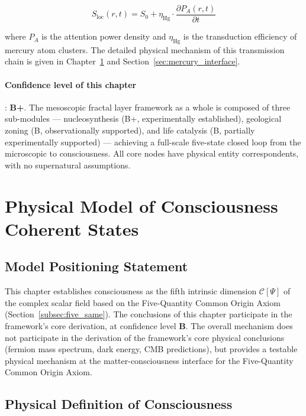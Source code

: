 \documentclass[12pt,a4paper,twocolumn]{article}
\begin{document}
\begin{equation}
\label{eq:Sloc_meso}
S_{\text{loc}}(r,t) = S_0 + \eta_{\text{Hg}} \cdot \frac{\partial P_A(r,t)}{\partial t}
\end{equation}

where $P_A$ is the attention power density and $\eta_{\text{Hg}}$ is the transduction efficiency of mercury atom clusters. The detailed physical mechanism of this transmission chain is given in Chapter~\ref{sec:consciousness} and Section~\ref{sec:mercury_interface}.

\paragraph{Confidence level of this chapter}: \textbf{B+}. The mesoscopic fractal layer framework as a whole is composed of three sub-modules --- nucleosynthesis (B+, experimentally established), geological zoning (B, observationally supported), and life catalysis (B, partially experimentally supported) --- achieving a full-scale five-state closed loop from the microscopic to consciousness. All core nodes have physical entity correspondents, with no supernatural assumptions.

\section{Physical Model of Consciousness Coherent States}
\label{sec:consciousness}

\subsection{Model Positioning Statement}
This chapter establishes consciousness as the fifth intrinsic dimension $\mathcal{C}[\Psi]$ of the complex scalar field based on the Five-Quantity Common Origin Axiom (Section~\ref{subsec:five_same}). The conclusions of this chapter participate in the framework's core derivation, at confidence level \textbf{B}. The overall mechanism does not participate in the derivation of the framework's core physical conclusions (fermion mass spectrum, dark energy, CMB predictions), but provides a testable physical mechanism at the matter-consciousness interface for the Five-Quantity Common Origin Axiom.

\subsection{Physical Definition of Consciousness}
\end{document}
